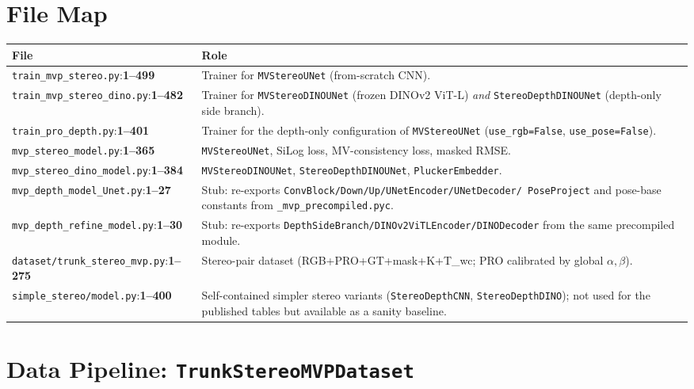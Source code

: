 \documentclass[11pt]{article}
\newcommand{\fref}[2]{\texttt{\textcolor{filegray}{#1}}:\textbf{#2}}
\begin{document}
\section{File Map}

\begin{center}\small
\begin{tabular}{p{6cm}p{8.5cm}}
\toprule
\textbf{File} & \textbf{Role} \\
\midrule
\fref{train\_mvp\_stereo.py}{1--499} &
  Trainer for \texttt{MVStereoUNet} (from-scratch CNN). \\
\fref{train\_mvp\_stereo\_dino.py}{1--482} &
  Trainer for \texttt{MVStereoDINOUNet} (frozen DINOv2 ViT-L)
  \emph{and} \texttt{StereoDepthDINOUNet} (depth-only side branch). \\
\fref{train\_pro\_depth.py}{1--401} &
  Trainer for the depth-only configuration of \texttt{MVStereoUNet}
  (\texttt{use\_rgb=False}, \texttt{use\_pose=False}). \\
\fref{mvp\_stereo\_model.py}{1--365} &
  \texttt{MVStereoUNet}, SiLog loss, MV-consistency loss, masked RMSE. \\
\fref{mvp\_stereo\_dino\_model.py}{1--384} &
  \texttt{MVStereoDINOUNet}, \texttt{StereoDepthDINOUNet},
  \texttt{PluckerEmbedder}. \\
\fref{mvp\_depth\_model\_Unet.py}{1--27} &
  Stub: re-exports \texttt{ConvBlock/Down/Up/UNetEncoder/UNetDecoder/
  PoseProject} and pose-base constants from
  \texttt{\_mvp\_precompiled.pyc}. \\
\fref{mvp\_depth\_refine\_model.py}{1--30} &
  Stub: re-exports \texttt{DepthSideBranch/DINOv2ViTLEncoder/DINODecoder}
  from the same precompiled module. \\
\fref{dataset/trunk\_stereo\_mvp.py}{1--275} &
  Stereo-pair dataset (RGB+PRO+GT+mask+K+T\_wc; PRO calibrated by
  global $\alpha,\beta$). \\
\fref{simple\_stereo/model.py}{1--400} &
  Self-contained simpler stereo variants
  (\texttt{StereoDepthCNN}, \texttt{StereoDepthDINO}); not used for
  the published tables but available as a sanity baseline. \\
\bottomrule
\end{tabular}
\end{center}

\section{Data Pipeline: \texttt{TrunkStereoMVPDataset}}
\end{document}
